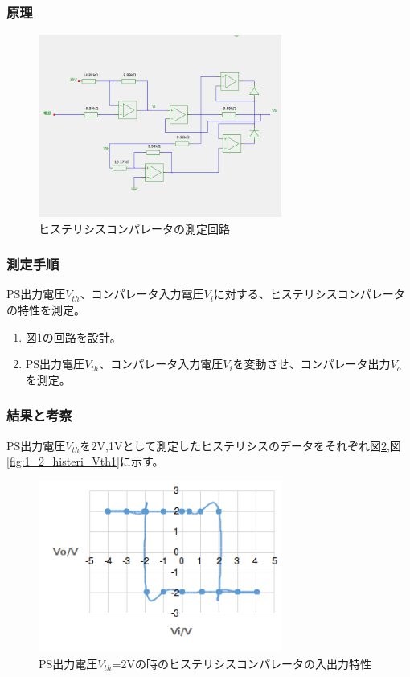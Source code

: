 \documentclass[11pt,a4j]{jsarticle}
\begin{document}
   \subsubsection{原理}
    
    \begin{figure}[htbp]
  \centering
  \includegraphics[width=8cm,clip]{histeri_tokusei.png}
  \caption{ヒステリシスコンパレータの測定回路}
  \label{fig:histeri_tokusei}
 \end{figure}%
    
   \subsubsection{測定手順}
    PS出力電圧$V_{th}$、コンパレータ入力電圧$V_i$に対する、ヒステリシスコンパレータの特性を測定。
    \begin{enumerate}
    \item 図\ref{fig:histeri_tokusei}の回路を設計。
    \item PS出力電圧$V_{th}$、コンパレータ入力電圧$V_i$を変動させ、コンパレータ出力$V_o$を測定。
    \end{enumerate}
    
   \subsubsection{結果と考察}
    PS出力電圧$V_{th}$を2V,1Vとして測定したヒステリシスのデータをそれぞれ図\ref{fig:1_2_histeri_Vth2},図\ref{fig:1_2_histeri_Vth1}に示す。
    
    \begin{figure}[htbp]
  \centering
  \includegraphics[width=8cm,clip]{1_2_histeri_Vth2.png}
  \caption{PS出力電圧$V_{th}$=2Vの時のヒステリシスコンパレータの入出力特性}
  \label{fig:1_2_histeri_Vth2}
 \end{figure}%
    
\end{document}
